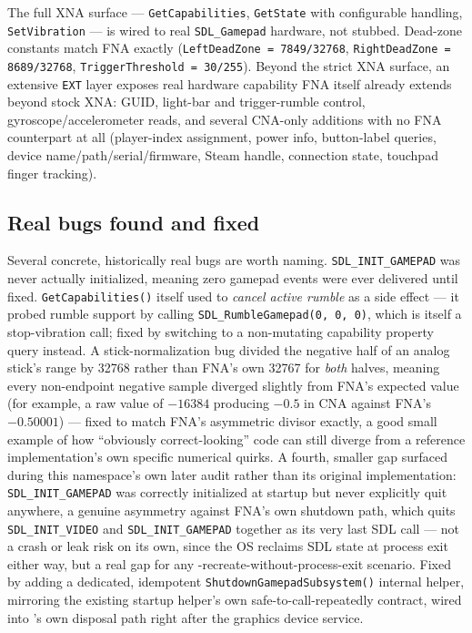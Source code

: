 The full XNA surface --- \texttt{GetCapabilities}, \texttt{GetState} with configurable
 handling, \texttt{SetVibration} --- is wired to real
\texttt{SDL\_Gamepad} hardware, not stubbed. Dead-zone constants match FNA exactly
(\texttt{LeftDeadZone = 7849/32768}, \texttt{RightDeadZone = 8689/32768},
\texttt{TriggerThreshold = 30/255}). Beyond the strict XNA surface, an extensive
\texttt{EXT} layer exposes real hardware capability FNA itself already extends beyond stock
XNA: GUID, light-bar and trigger-rumble control, gyroscope/accelerometer reads, and several
CNA-only additions with no FNA counterpart at all (player-index assignment, power info,
button-label queries, device name/path/serial/firmware, Steam handle, connection state,
touchpad finger tracking).

\subsection{Real bugs found and fixed}

Several concrete, historically real bugs are worth naming. \texttt{SDL\_INIT\_GAMEPAD} was
never actually initialized, meaning zero gamepad events were ever delivered until fixed.
\texttt{GetCapabilities()} itself used to \emph{cancel active rumble} as a side effect ---
it probed rumble support by calling \texttt{SDL\_RumbleGamepad(0, 0, 0)}, which is itself a
stop-vibration call; fixed by switching to a non-mutating capability property query instead.
A stick-normalization bug divided the negative half of an analog stick's range by 32768
rather than FNA's own 32767 for \emph{both} halves, meaning every non-endpoint negative
sample diverged slightly from FNA's expected value (for example, a raw value of $-16384$
producing $-0.5$ in CNA against FNA's $-0.50001$) --- fixed to match FNA's asymmetric divisor
exactly, a good small example of how ``obviously correct-looking'' code can still diverge
from a reference implementation's own specific numerical quirks. A fourth, smaller gap
surfaced during this namespace's own later audit rather than its original implementation:
\texttt{SDL\_INIT\_GAMEPAD} was correctly initialized at startup but never explicitly quit
anywhere, a genuine asymmetry against FNA's own shutdown path, which quits
\texttt{SDL\_INIT\_VIDEO} and \texttt{SDL\_INIT\_GAMEPAD} together as its very last SDL call ---
not a crash or leak risk on its own, since the OS reclaims SDL state at process exit either
way, but a real gap for any -recreate-without-process-exit scenario.
Fixed by adding a dedicated, idempotent \texttt{ShutdownGamepadSubsystem()} internal helper,
mirroring the existing startup helper's own safe-to-call-repeatedly contract, wired into
's own disposal path right after the graphics device service.

